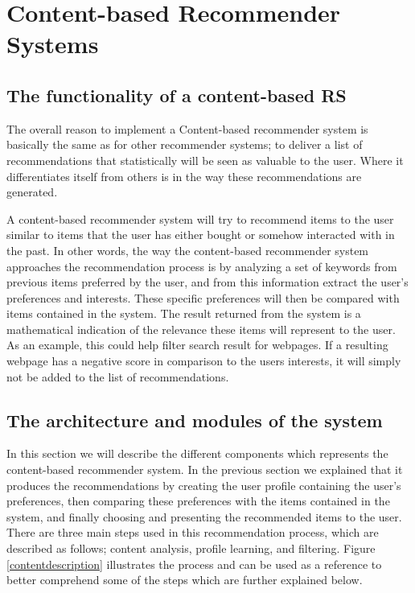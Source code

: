 \section{Content-based Recommender Systems}
\label{sec:content}

\subsection{The functionality of a content-based RS}
The overall reason to implement a Content-based recommender system is basically the same as for other recommender systems; to deliver a list of recommendations that statistically will be seen as valuable to the user. Where it differentiates itself from others is in the way these recommendations are generated.\newline 

A content-based recommender system will try to recommend items to the user similar to items that the user has either bought or somehow interacted with in the past. In other words, the way the content-based recommender system approaches the recommendation process is by analyzing a set of keywords from previous items preferred by the user, and from this information extract the user's preferences and interests.\newline 
These specific preferences will then be compared with items contained in the system. The result returned from the system is a mathematical indication of the relevance these items will represent to the user. As an example, this could help filter search result for webpages. If a resulting webpage has a negative score in comparison to the users interests, it will simply not be added to the list of recommendations.

\subsection{The architecture and modules of the system}
In this section we will describe the different components which represents the content-based recommender system. In the previous section we explained that it produces the recommendations by creating the user profile containing the user's preferences, then comparing these preferences with the items contained in the system, and finally choosing and presenting the recommended items to the user. \newline
There are three main steps used in this recommendation process, which are described as follows; content analysis, profile learning, and filtering. Figure \ref{contentdescription} illustrates the process and can be used as a reference to better comprehend some of the steps which are further explained below.

